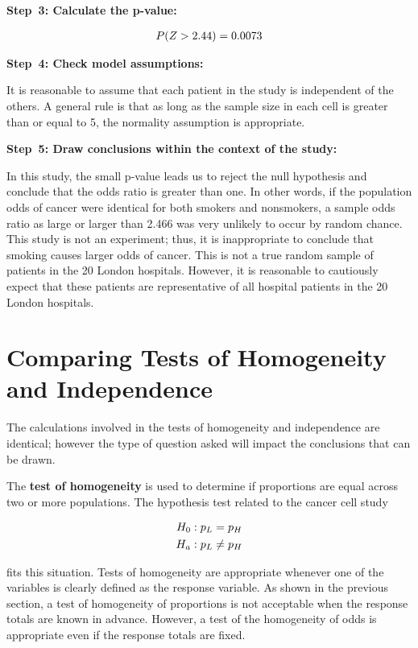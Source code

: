 \documentclass[
]{report}
\begin{document}
\textbf{Step~3: Calculate the p-value:}

\begin{align}
P(Z > 2.44) = 0.0073 
\notag
\end{align}

\textbf{Step~4: Check model assumptions:}

It is reasonable to assume that each patient in the study is independent of the others. A general rule is that as long as the sample size in each cell is greater than or equal to 5, the normality assumption is appropriate.

\textbf{Step~5: Draw conclusions within the context of the study:}

In this study, the small p-value leads us to reject the null hypothesis and conclude that the odds ratio is greater than one. In other words, if the population odds of cancer were identical for both smokers and nonsmokers, a sample odds ratio as large or larger than 2.466 was very unlikely to occur by random chance. This study is not an experiment; thus, it is inappropriate to conclude that smoking causes larger odds of cancer. This is not a true random sample of patients in the 20 London hospitals. However, it is reasonable to cautiously expect that these patients are representative of all hospital patients in the 20 London hospitals.

\section{\texorpdfstring{\textbf{Comparing Tests of Homogeneity and Independence}}{Comparing Tests of Homogeneity and Independence}}\label{comparing-tests-of-homogeneity-and-independence}

The calculations involved in the tests of homogeneity and independence are identical; however the type of question asked will impact the conclusions that can be drawn.

The \textbf{test of homogeneity} is used to determine if proportions are equal across two or more populations. The hypothesis test related to the cancer cell study

\begin{align}
H_0: p_L &= p_H \notag \\ 
H_a: p_L &\neq p_H \notag
\end{align}

fits this situation. Tests of homogeneity are appropriate whenever one of the variables is clearly defined as the response variable. As shown in the previous section, a test of homogeneity of proportions is not acceptable when the response totals are known in advance. However, a test of the homogeneity of odds is appropriate even if the response totals are fixed.
\end{document}
